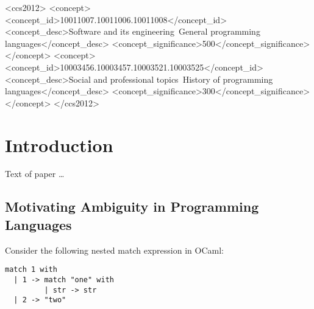 \documentclass[sigplan]{acmart}\settopmatter{printfolios=true,printccs=false,printacmref=false}
\begin{document}
\begin{CCSXML}
<ccs2012>
<concept>
<concept_id>10011007.10011006.10011008</concept_id>
<concept_desc>Software and its engineering~General programming languages</concept_desc>
<concept_significance>500</concept_significance>
</concept>
<concept>
<concept_id>10003456.10003457.10003521.10003525</concept_id>
<concept_desc>Social and professional topics~History of programming languages</concept_desc>
<concept_significance>300</concept_significance>
</concept>
</ccs2012>
\end{CCSXML}





\maketitle


\section{Introduction}

Text of paper \ldots

\subsection{Motivating Ambiguity in Programming Languages}

Consider the following nested match expression in OCaml:

\begin{lstlisting}[language={[objective]caml}]
match 1 with
  | 1 -> match "one" with
         | str -> str
  | 2 -> "two"
\end{lstlisting}
\end{document}
